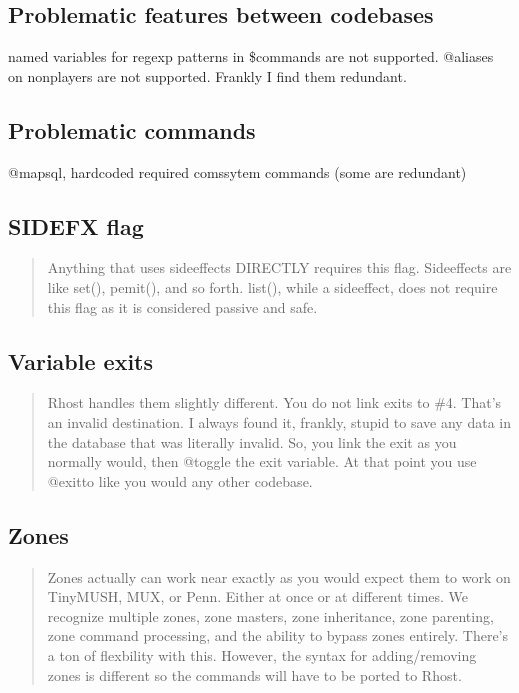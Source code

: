 \documentclass[letterpaper,10pt,english]{sphinxmanual}
\begin{document}
\subsection{Problematic features between codebases}
\label{\detokenize{differences:problematic-features-between-codebases}}
\sphinxAtStartPar
named variables for regexp patterns in \$commands are not supported.
@aliases on non\sphinxhyphen{}players are not supported.  Frankly I find them redundant.


\subsection{Problematic commands}
\label{\detokenize{differences:problematic-commands}}
\sphinxAtStartPar
@mapsql, hardcoded required comssytem commands (some are redundant)


\subsection{SIDEFX flag}
\label{\detokenize{differences:sidefx-flag}}\begin{quote}

\sphinxAtStartPar
Anything that uses sideeffects \textendash{}DIRECTLY\textendash{} requires this flag.
Sideeffects are like set(), pemit(), and so forth.  list(), while a
side\sphinxhyphen{}effect, does not require this flag as it is considered passive and safe.
\end{quote}


\subsection{Variable exits}
\label{\detokenize{differences:variable-exits}}\begin{quote}

\sphinxAtStartPar
Rhost handles them slightly different.  You do not link
exits to \#\sphinxhyphen{}4.  That’s an invalid destination.  I always found it, frankly,
stupid to save any data in the database that was literally invalid.  So,
you link the exit as you normally would, then @toggle the exit variable.
At that point you use @exitto like you would any other codebase.
\end{quote}


\subsection{Zones}
\label{\detokenize{differences:zones}}\begin{quote}

\sphinxAtStartPar
Zones actually can work near exactly as you would expect them to
work on TinyMUSH, MUX, or Penn.  Either at once or at different times.
We recognize multiple zones, zone masters, zone inheritance, zone
parenting, zone command processing, and the ability to bypass zones
entirely.  There’s a ton of flexbility with this.  However, the syntax
for adding/removing zones is different so the commands will have to be
ported to Rhost.
\end{quote}
\end{document}

